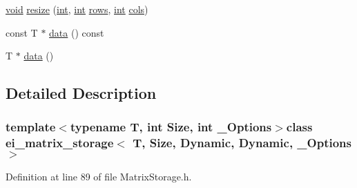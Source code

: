 \begin{DoxyCompactItemize}
\hyperlink{group___u_a_v_objects_plugin_ga444cf2ff3f0ecbe028adce838d373f5c}{void} \hyperlink{classei__matrix__storage_3_01_t_00_01_size_00_01_dynamic_00_01_dynamic_00_01___options_01_4_a859fc01cbe196612a58894e14d57860c}{resize} (\hyperlink{ioapi_8h_a787fa3cf048117ba7123753c1e74fcd6}{int}, \hyperlink{ioapi_8h_a787fa3cf048117ba7123753c1e74fcd6}{int} \hyperlink{classei__matrix__storage_3_01_t_00_01_size_00_01_dynamic_00_01_dynamic_00_01___options_01_4_a6ea6584bd7d0009d9f845ac707b85291}{rows}, \hyperlink{ioapi_8h_a787fa3cf048117ba7123753c1e74fcd6}{int} \hyperlink{classei__matrix__storage_3_01_t_00_01_size_00_01_dynamic_00_01_dynamic_00_01___options_01_4_a58dddb1ac8188864712c68341a7328e3}{cols})
\item 
const T $\ast$ \hyperlink{classei__matrix__storage_3_01_t_00_01_size_00_01_dynamic_00_01_dynamic_00_01___options_01_4_a36220ae896e435702648110066d48343}{data} () const 
\item 
T $\ast$ \hyperlink{classei__matrix__storage_3_01_t_00_01_size_00_01_dynamic_00_01_dynamic_00_01___options_01_4_a25ba8832ad3872e38f92a89e13bd1b2b}{data} ()
\end{DoxyCompactItemize}


\subsection{Detailed Description}
\subsubsection*{template$<$typename T, int Size, int \-\_\-\-Options$>$class ei\-\_\-matrix\-\_\-storage$<$ T, Size, Dynamic, Dynamic, \-\_\-\-Options $>$}



Definition at line 89 of file Matrix\-Storage.\-h.



